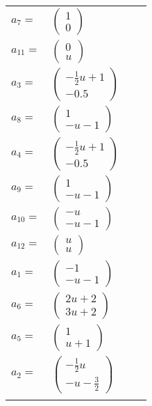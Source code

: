 \documentclass[1p]{elsarticle_modified}
\theoremstyle{definition}
\begin{document}
\begin{tabular}{m{7pt} m{180pt} m{7pt} m{180pt} }
\flushright $a_{7}=$&$\begin{pmatrix}1\\0\end{pmatrix}$ \\
\flushright $a_{11}=$&$\begin{pmatrix}0\\u\end{pmatrix}$ \\
\flushright $a_{3}=$&$\begin{pmatrix}-\frac{1}{2} u+1\\-0.5\end{pmatrix}$ \\
\flushright $a_{8}=$&$\begin{pmatrix}1\\- u-1\end{pmatrix}$ \\
\flushright $a_{4}=$&$\begin{pmatrix}-\frac{1}{2} u+1\\-0.5\end{pmatrix}$ \\
\flushright $a_{9}=$&$\begin{pmatrix}1\\- u-1\end{pmatrix}$ \\
\flushright $a_{10}=$&$\begin{pmatrix}- u\\- u-1\end{pmatrix}$ \\
\flushright $a_{12}=$&$\begin{pmatrix}u\\u\end{pmatrix}$ \\
\flushright $a_{1}=$&$\begin{pmatrix}-1\\- u-1\end{pmatrix}$ \\
\flushright $a_{6}=$&$\begin{pmatrix}2 u+2\\3 u+2\end{pmatrix}$ \\
\flushright $a_{5}=$&$\begin{pmatrix}1\\u+1\end{pmatrix}$ \\
\flushright $a_{2}=$&$\begin{pmatrix}-\frac{1}{2} u\\- u-\frac{3}{2}\end{pmatrix}$\\&\end{tabular}
\end{document}
